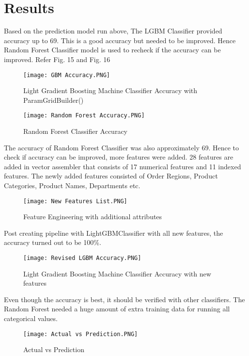 \documentclass[journal,twoside,web]{ieeecolor}
\begin{document}
\section{Results}
Based on the prediction model run above, The LGBM Classifier provided accuracy up to 69\text {\%}. This is a good accuracy but needed to be improved. Hence Random Forest Classifier model is used to recheck if the accuracy can be improved. Refer Fig. 15 and Fig. 16
\begin{figure}[htbp]
\centerline{\texttt{[image: GBM Accuracy.PNG]}}
\caption{Light Gradient Boosting Machine Classifier Accuracy with ParamGridBuilder()}
\label{fig15 }
\end{figure}

\begin{figure}[htbp]
\centerline{\texttt{[image: Random Forest Accuracy.PNG]}
}
\caption{ Random Forest Classifier Accuracy}
\label{fig16 }
\end{figure}

The accuracy of Random Forest Classifier was also approximately 69\text {\%}. Hence to check if accuracy can be improved, more features were added. 28 features are added in vector assembler that consists of 17 numerical features and 11 indexed features. The newly added features consisted of Order Regions, Product Categories, Product Names,  Departments etc.

\begin{figure}[htbp]
\centerline{\texttt{[image: New Features List.PNG]}
}
\caption{ Feature Engineering with additional attributes}
\label{fig17 }
\end{figure}

Post creating pipeline with LightGBMClassifier with all new features, the accuracy turned out to be 100{\%}.

\begin{figure}[htbp]
\centerline{\texttt{[image: Revised LGBM Accuracy.PNG]}
}
\caption{ Light Gradient Boosting Machine Classifier Accuracy with new features}
\label{fig18 }
\end{figure}

Even though the accuracy is best, it should be verified with other classifiers. The Random Forest needed a huge amount of extra training data for running all categorical values. \\

\begin{figure}[htbp]
\centerline{\texttt{[image: Actual vs Prediction.PNG]}
}
\caption{ Actual vs Prediction}
\label{fig19 }
\end{figure}
\end{document}
